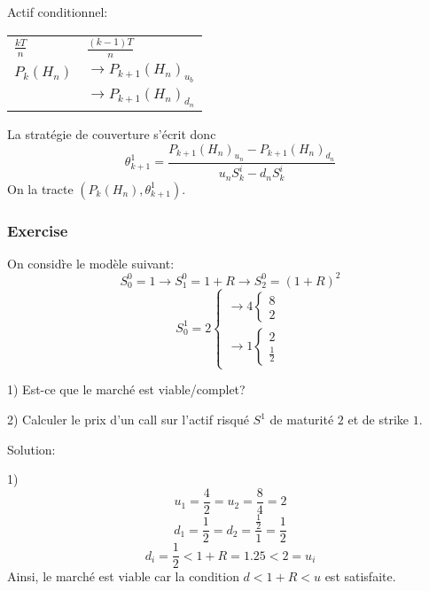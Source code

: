 \documentclass{article}
\theoremstyle{plain}
\theoremstyle{definition}
\begin{document}
Actif conditionnel:
\begin{center}
\begin{tabular}{ll}
$\frac{kT}{n}$ & $\frac{(k-1)T}{n}$ \\ 
$P_k(H_n)$ & $\rightarrow P_{k+1}(H_n)_{u_b}$\\
&$\rightarrow P_{k+1}(H_n)_{d_n}$
\end{tabular}
\end{center}

La strat\'egie de couverture s'\'ecrit donc
\begin{equation}
\theta_{k+1}^1=\frac{P_{k+1}{(H_n)_{u_n}}-P_{k+1}(H_n)_{d_n}}{u_nS_k^i-d_nS_k^i}
\end{equation}
On la tracte $(P_k(H_n),\theta_{k+1}^1)$.

\subsubsection{Exercise}
On consid\`re le mod\`ele suivant:
\begin{equation}
S_0^0=1\rightarrow S_1^0=1+R\rightarrow S_2^0=(1+R)^2
\end{equation}
\begin{equation}
S_0^1=2
\left\{
\begin{array}{l}
\rightarrow 4\left\{\begin{array}{l}
8\\
2
\end{array}\right.\\
\rightarrow 1
\left\{\begin{array}{l}
2\\
\frac{1}{2}
\end{array}\right.
\end{array}\right.
\end{equation}

1) Est-ce que le march\'e est viable/complet?

2) Calculer le prix d'un call sur l'actif risqu\'e $S^1$ de maturit\'e $2$ et de strike $1$.

Solution:

1)
\begin{equation}
u_1=\frac{4}{2}=u_2=\frac{8}{4}=2
\end{equation}
\begin{equation}
	d_1=\frac{1}{2}=d_2=\frac{\frac{1}{2}}{1}=\frac{1}{2}
\end{equation}
\begin{equation}
d_i=\frac{1}{2}<1+R=1.25<2=u_i
\end{equation}
Ainsi, le march\'e est viable car la condition $d<1+R<u$ est satisfaite.
\end{document}
